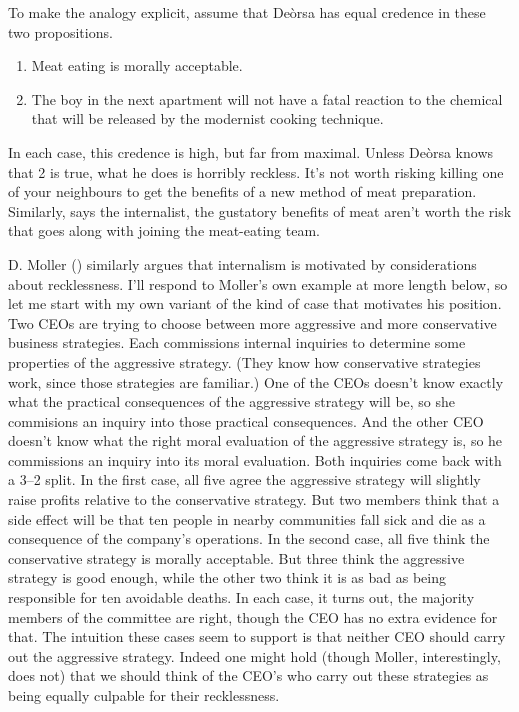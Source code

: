 \documentclass[
  10pt,
  letterpaper,
  twoside]{scrbook}
\providecommand{\tightlist}{%
  \setlength{\itemsep}{0pt}\setlength{\parskip}{0pt}}\usepackage{longtable,booktabs,array}
\begin{document}
To make the analogy explicit, assume that Deòrsa has equal credence in
these two propositions.

\begin{enumerate}
\def\labelenumi{\arabic{enumi}.}
\tightlist
\item
  Meat eating is morally acceptable.
\item
  The boy in the next apartment will not have a fatal reaction to the
  chemical that will be released by the modernist cooking technique.
\end{enumerate}

In each case, this credence is high, but far from maximal. Unless Deòrsa
knows that 2 is true, what he does is horribly reckless. It's not worth
risking killing one of your neighbours to get the benefits of a new
method of meat preparation. Similarly, says the internalist, the
gustatory benefits of meat aren't worth the risk that goes along with
joining the meat-eating team.

D. Moller () similarly argues that
internalism is motivated by considerations about recklessness. I'll
respond to Moller's own example at more length below, so let me start
with my own variant of the kind of case that motivates his position. Two
CEOs are trying to choose between more aggressive and more conservative
business strategies. Each commissions internal inquiries to determine
some properties of the aggressive strategy. (They know how conservative
strategies work, since those strategies are familiar.) One of the CEOs
doesn't know exactly what the practical consequences of the aggressive
strategy will be, so she commisions an inquiry into those practical
consequences. And the other CEO doesn't know what the right moral
evaluation of the aggressive strategy is, so he commissions an inquiry
into its moral evaluation. Both inquiries come back with a 3--2 split.
In the first case, all five agree the aggressive strategy will slightly
raise profits relative to the conservative strategy. But two members
think that a side effect will be that ten people in nearby communities
fall sick and die as a consequence of the company's operations. In the
second case, all five think the conservative strategy is morally
acceptable. But three think the aggressive strategy is good enough,
while the other two think it is as bad as being responsible for ten
avoidable deaths. In each case, it turns out, the majority members of
the committee are right, though the CEO has no extra evidence for that.
The intuition these cases seem to support is that neither CEO should
carry out the aggressive strategy. Indeed one might hold (though Moller,
interestingly, does not) that we should think of the CEO's who carry out
these strategies as being equally culpable for their recklessness.
\end{document}
